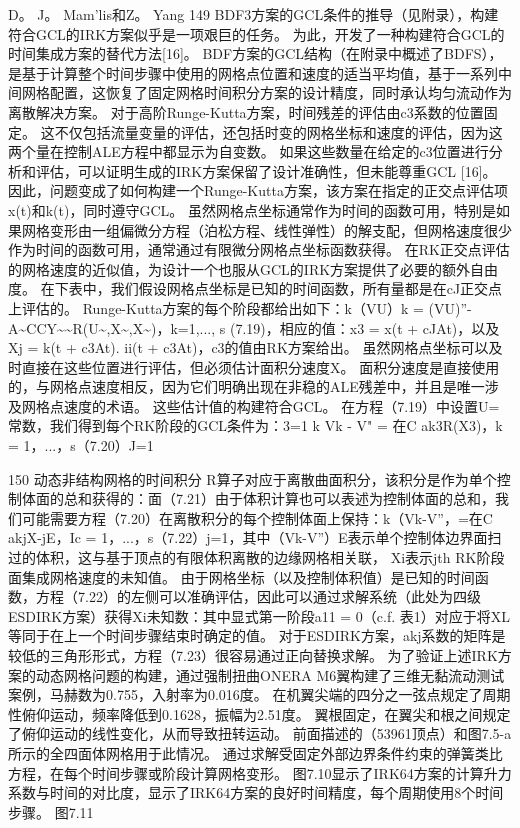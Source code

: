 \documentclass[UTF8,11pt,a4paper,openany,fontset=fandol]{ctexbook}
\begin{document}
D。 J。 Mam'lis和Z。 Yang 149 BDF3方案的GCL条件的推导（见附录），构建符合GCL的IRK方案似乎是一项艰巨的任务。 为此，开发了一种构建符合GCL的时间集成方案的替代方法[16]。 BDF方案的GCL结构（在附录中概述了BDFS），是基于计算整个时间步骤中使用的网格点位置和速度的适当平均值，基于一系列中间网格配置，这恢复了固定网格时间积分方案的设计精度，同时承认均匀流动作为离散解决方案。 对于高阶Runge-Kutta方案，时间残差的评估由c3系数的位置固定。 这不仅包括流量变量的评估，还包括时变的网格坐标和速度的评估，因为这两个量在控制ALE方程中都显示为自变数。 如果这些数量在给定的c3位置进行分析和评估，可以证明生成的IRK方案保留了设计准确性，但未能尊重GCL [16]。 因此，问题变成了如何构建一个Runge-Kutta方案，该方案在指定的正交点评估项x(t)和k(t)，同时遵守GCL。 虽然网格点坐标通常作为时间的函数可用，特别是如果网格变形由一组偏微分方程（泊松方程、线性弹性）的解支配，但网格速度很少作为时间的函数可用，通常通过有限微分网格点坐标函数获得。 在RK正交点评估的网格速度的近似值，为设计一个也服从GCL的IRK方案提供了必要的额外自由度。 在下表中，我们假设网格点坐标是已知的时间函数，所有量都是在cJ正交点上评估的。 Runge-Kutta方案的每个阶段都给出如下：k（VU）k = (VU)”-A\textasciitilde{}CCY\textasciitilde{}\textasciitilde{}R(U\textasciitilde{},X\textasciitilde{},X\textasciitilde{})，k=1,..., s (7.19)，相应的值：x3 = x(t + cJAt)，以及Xj = k(t + c3At). ii(t + c3At)，c3的值由RK方案给出。 虽然网格点坐标可以及时直接在这些位置进行评估，但必须估计面积分速度X。 面积分速度是直接使用的，与网格点速度相反，因为它们明确出现在非稳的ALE残差中，并且是唯一涉及网格点速度的术语。 这些估计值的构建符合GCL。 在方程（7.19）中设置U=常数，我们得到每个RK阶段的GCL条件为：3=1 k Vk - V" = 在C ak3R(X3)，k = 1，...，s（7.20）J=1

150 动态非结构网格的时间积分 R算子对应于离散曲面积分，该积分是作为单个控制体面的总和获得的：面（7.21）由于体积计算也可以表述为控制体面的总和，我们可能需要方程（7.20）在离散积分的每个控制体面上保持：k（Vk-V”，=在C akjX-jE，Ic = 1，...，s（7.22）j=1，其中（Vk-V”）E表示单个控制体边界面扫过的体积，这与基于顶点的有限体积离散的边缘网格相关联， Xi表示jth RK阶段面集成网格速度的未知值。 由于网格坐标（以及控制体积值）是已知的时间函数，方程（7.22）的左侧可以准确评估，因此可以通过求解系统（此处为四级ESDIRK方案）获得Xi未知数：其中显式第一阶段a11 = 0（c.f. 表1）对应于将XL等同于在上一个时间步骤结束时确定的值。 对于ESDIRK方案，akj系数的矩阵是较低的三角形形式，方程（7.23）很容易通过正向替换求解。 为了验证上述IRK方案的动态网格问题的构建，通过强制扭曲ONERA M6翼构建了三维无黏流动测试案例，马赫数为0.755，入射率为0.016度。 在机翼尖端的四分之一弦点规定了周期性俯仰运动，频率降低到0.1628，振幅为2.51度。 翼根固定，在翼尖和根之间规定了俯仰运动的线性变化，从而导致扭转运动。 前面描述的（53961顶点）和图7.5-a所示的全四面体网格用于此情况。 通过求解受固定外部边界条件约束的弹簧类比方程，在每个时间步骤或阶段计算网格变形。 图7.10显示了IRK64方案的计算升力系数与时间的对比度，显示了IRK64方案的良好时间精度，每个周期使用8个时间步骤。 图7.11
\end{document}
